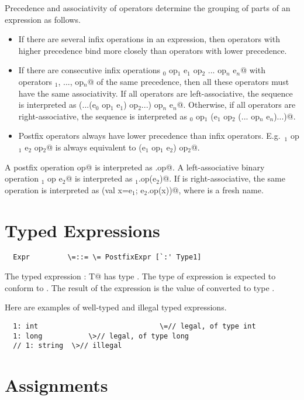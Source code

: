 \documentclass[11pt]{report}
\begin{document}
Precedence and associativity of operators determine the grouping of
parts of an expression as follows.
\begin{itemize}
\item If there are several infix operations in an
expression, then operators with higher precedence bind more closely
than operators with lower precedence.
\item If there are consecutive infix
operations \verb@e$_0$ op$_1$ e$_1$ op$_2$ ... op$_n$ e$_n$@ 
with operators \verb@op$_1$, ..., op$_n$@ of the same precedence, 
then all these operators must
have the same associativity. If all operators are left-associative,
the sequence is interpreted as
\verb@(...(e$_0$ op$_1$ e$_1$) op$_2$...) op$_n$ e$_n$@. 
Otherwise, if all operators are right-associative, the
sequence is interpreted as
\verb@e$_0$ op$_1$ (e$_1$ op$_2$ (... op$_n$ e$_n$)...)@.
\item
Postfix operators always have lower precedence than infix
operators. E.g.\ \verb@e$_1$ op$_1$ e$_2$ op$_2$@ is always equivalent to
\verb@(e$_1$ op$_1$ e$_2$) op$_2$@.
\end{itemize}
A postfix operation \verb@e op@ is interpreted as \verb@e.op@. A
left-associative binary operation \verb@e$_1$ op e$_2$@ is interpreted as
\verb@e$_1$.op(e$_2$)@. If \verb@op@ is right-associative, the same operation is
interpreted as \verb@(val x=e$_1$; e$_2$.op(x))@, 
where \verb@x@ is a fresh name.

\section{Typed Expressions}

\syntax\begin{verbatim}
  Expr	       \=::= \= PostfixExpr [`:' Type1]
\end{verbatim}

The typed expression \verb@e: T@ has type \verb@T@. The type of
expression \verb@e@ is expected to conform to \verb@T@. The result of
the expression is the value of \verb@e@ converted to type \verb@T@.

\example Here are examples of well-typed and illegal typed expressions.

\begin{verbatim}
  1: int                             \=// legal, of type int
  1: long	    	\>// legal, of type long
  // 1: string 	\>// illegal
\end{verbatim}

\section{Assignments}
\end{document}
